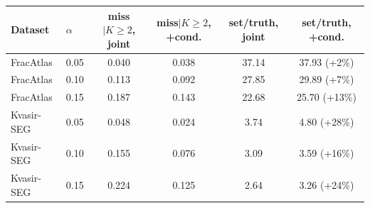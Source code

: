 \begin{tabular}{llcccc}
\toprule
Dataset & $\alpha$ & miss$\mid K{\ge}2$, joint & miss$\mid K{\ge}2$, +cond. & set/truth, joint & set/truth, +cond. \\
\midrule
FracAtlas & 0.05 & 0.040 & 0.038 & 37.14 & 37.93 (+2\%) \\
FracAtlas & 0.10 & 0.113 & 0.092 & 27.85 & 29.89 (+7\%) \\
FracAtlas & 0.15 & 0.187 & 0.143 & 22.68 & 25.70 (+13\%) \\
Kvasir-SEG & 0.05 & 0.048 & 0.024 & 3.74 & 4.80 (+28\%) \\
Kvasir-SEG & 0.10 & 0.155 & 0.076 & 3.09 & 3.59 (+16\%) \\
Kvasir-SEG & 0.15 & 0.224 & 0.125 & 2.64 & 3.26 (+24\%) \\
\bottomrule
\end{tabular}
